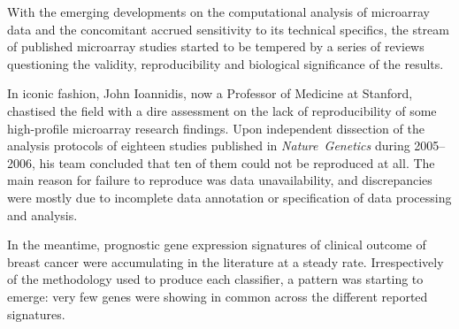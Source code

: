 With the emerging developments on the computational analysis of microarray
data\cite{quackenbush_computational_2001} and the concomitant accrued
sensitivity to its technical specifics, the stream of published microarray
studies started to be tempered by a series of reviews questioning the validity,
reproducibility and biological significance of the
results.\cite{michiels_prediction_2005,tinker_challenges_2006,kawasaki_end_2006,cahan_meta-analysis_2007,gusnanto_identification_2007,mathoulin-pelissier_survival_2008,kim_expectations_2010}

In iconic fashion, John Ioannidis, now a Professor of Medicine at Stanford,
chastised the field with a dire assessment on the lack of reproducibility of
some \mbox{high-profile} microarray research
findings.\cite{ioannidis_repeatability_2009} Upon independent dissection of the
analysis protocols of eighteen studies published in \mbox{\emph{Nature
    Genetics}} during 2005--2006, his team concluded that ten of them could not
be reproduced at all.  The main reason for failure to reproduce was data
unavailability, and discrepancies were mostly due to incomplete data annotation
or specification of data processing and analysis.

In the meantime, prognostic gene expression signatures of clinical outcome of
breast cancer were accumulating in the literature at a steady
rate.\cite{vant_veer_gene_2002,paik_multigene_2004,ma_two-gene_2004,wang_gene-expression_2005,chang_robustness_2005,miller_expression_2005,glinsky_microarray_2005,foekens_multicenter_2006,naderi_gene-expression_2006,teschendorff_consensus_2006,sotiriou_gene_2006,liu_prognostic_2007}
Irrespectively of the methodology used to produce each classifier, a pattern
was starting to emerge: very few genes were showing in common across the
different reported signatures.






